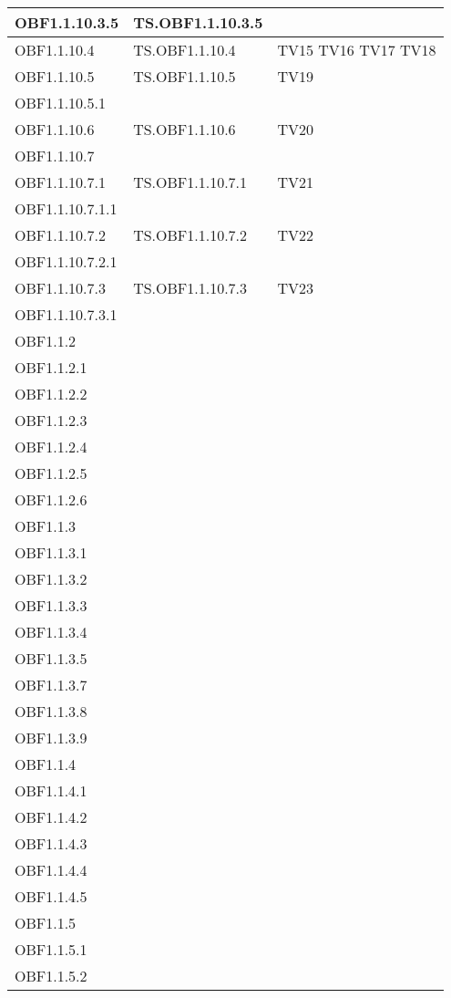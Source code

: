 \documentclass{scalatekids-article}
\begin{document}
\begin{longtable}[H]{|l|p{4cm}|p{4cm}|}
\hline
OBF1.1.10.3.5 & TS.OBF1.1.10.3.5 & \\
\hline
OBF1.1.10.4 & TS.OBF1.1.10.4 & TV15 TV16 TV17 TV18\\
\hline
OBF1.1.10.5 & TS.OBF1.1.10.5 & TV19\\
\hline
OBF1.1.10.5.1 & & \\
\hline
OBF1.1.10.6 & TS.OBF1.1.10.6 & TV20\\
\hline
OBF1.1.10.7 & & \\
\hline
OBF1.1.10.7.1 & TS.OBF1.1.10.7.1 & TV21\\
\hline
OBF1.1.10.7.1.1 & & \\
\hline
OBF1.1.10.7.2 & TS.OBF1.1.10.7.2 & TV22\\
\hline
OBF1.1.10.7.2.1 & & \\
\hline
OBF1.1.10.7.3 & TS.OBF1.1.10.7.3 & TV23\\
\hline
OBF1.1.10.7.3.1 & & \\
\hline
OBF1.1.2 & & \\
\hline
OBF1.1.2.1 & & \\
\hline
OBF1.1.2.2 &  & \\
\hline
OBF1.1.2.3 &  & \\
\hline
OBF1.1.2.4 &  & \\
\hline
OBF1.1.2.5 &  & \\
\hline
OBF1.1.2.6 &  & \\
\hline
OBF1.1.3 &  & \\
\hline
OBF1.1.3.1 &  &\\
\hline
OBF1.1.3.2 &  &\\
\hline
OBF1.1.3.3 &  &\\
\hline
OBF1.1.3.4 &  &\\
\hline
OBF1.1.3.5 &  &\\
\hline
OBF1.1.3.7 &  &\\
\hline
OBF1.1.3.8 &  &\\
\hline
OBF1.1.3.9 &  &\\
\hline
OBF1.1.4 &  &\\
\hline
OBF1.1.4.1 &  &\\
\hline
OBF1.1.4.2 &  &\\
\hline
OBF1.1.4.3 &  &\\
\hline
OBF1.1.4.4 &  &\\
\hline
OBF1.1.4.5 &  &\\
\hline
OBF1.1.5 &  &\\
\hline
OBF1.1.5.1 &  &\\
\hline
OBF1.1.5.2 &  &\\

\end{longtable}
\end{document}
